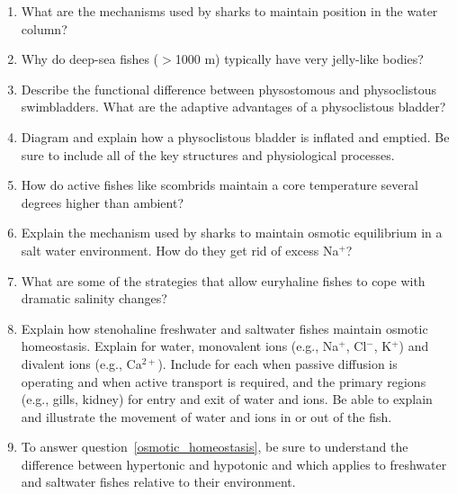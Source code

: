 \documentclass[nofonts, letterpaper]{tufte-handout}
\begin{document}
\begin{enumerate}
	\item What are the mechanisms used by sharks to maintain position in the water column?

	\item Why do deep-sea fishes ($>$1000 m) typically have very jelly-like bodies?

	\item Describe the functional difference between physostomous and physoclistous swimbladders.  What are the adaptive advantages of a physoclistous bladder?

	\item Diagram and explain how a physoclistous bladder is inflated and emptied. Be sure to include all of the key structures and physiological processes.

	\item How do active fishes like scombrids maintain a core temperature several degrees higher than ambient?


	\item Explain the mechanism used by sharks to maintain osmotic equilibrium in a salt water environment. How do they get rid of excess Na$^+$?

	\item What are some of the strategies that allow euryhaline fishes to cope with dramatic salinity changes?
	
	\item\label{osmotic_homeostasis} Explain how stenohaline freshwater and saltwater fishes maintain osmotic homeostasis.  Explain for water, monovalent ions (e.g., Na$^+$, Cl$^-$, K$^+$) and divalent ions (e.g., Ca$^{2+}$).  Include for each when passive diffusion is operating and when active transport is required, and the primary regions (e.g., gills, kidney) for entry and exit of water and ions.  Be able to explain and illustrate the movement of water and ions in or out of the fish.
	
	\item To answer question~\ref{osmotic_homeostasis}, be sure to understand the difference between hypertonic and hypotonic and which applies to freshwater and saltwater fishes relative to their environment.
\end{enumerate}
\end{document}
